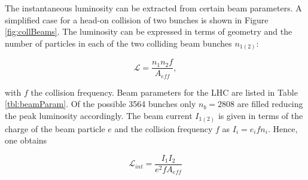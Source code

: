 The instantaneous luminosity can be extracted from certain beam parameters. A simplified case for a head-on collision of two bunches is shown in Figure \ref{fig:collBeams}. The luminosity can be expressed in terms of geometry and the number of particles in each of the two colliding beam bunches $n_{1(2)}$:

\begin{equation} \label{eq:intLumi}
\mathcal{L} = \frac{n_{1} n_{2} f}{A_{eff}},
\end{equation}

\noindent
with $f$ the collision frequency. Beam parameters for the LHC are listed in Table \ref{tbl:beamParam}. Of the possible 3564 bunches only $n_{b} = 2808$ are filled reducing the peak luminosity accordingly. The beam current $I_{1(2)}$ is given in terms of the charge of the beam particle $e$ and the collision frequency $f$ as $I_{i} = e_{i} f n_{i}$. Hence, one obtains

\begin{equation}
\mathcal{L}_{int} = \frac{I_{1} I_{2}}{e^{2} f A_{eff}}
\end{equation}

